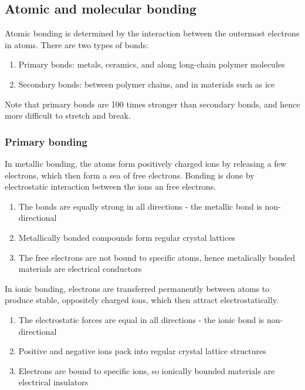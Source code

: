 \documentclass{article}
\begin{document}
\newpage

\subsection{Atomic and molecular bonding}

Atomic bonding is determined by the interaction between the outermost electrons in atoms. There are two types of bonds:

\begin{enumerate}
    \item Primary bonds: metals, ceramics, and along long-chain polymer molecules
    \item Secondary bonds: between polymer chains, and in materials such as ice
\end{enumerate}

Note that primary bonds are 100 times stronger than secondary bonds, and hence more difficult to stretch and break.

\subsubsection{Primary bonding}

\begin{definition}
    In metallic bonding, the atoms form positively charged ions by releasing a few electrons, which then form a sea of free electrons. Bonding is done by electrostatic interaction between the ions an free electrons.

    \begin{enumerate}
        \item The bonds are equally strong in all directions - the metallic bond is non-directional
        \item Metallically bonded compounds form regular crystal lattices
        \item The free electrons are not bound to specific atoms, hence metalically bonded materials are electrical conductors
    \end{enumerate}
\end{definition}

\begin{definition}
    In ionic bonding, electrons are transferred permanently between atoms to produce stable, oppositely charged ions, which then attract electrostatically.

    \begin{enumerate}
        \item The electrostatic forces are equal in all directions - the ionic bond is non-directional
        \item Positive and negative ions pack into regular crystal lattice structures
        \item Electrons are bound to specific ions, so ionically bounded materials are electrical insulators
    \end{enumerate}
\end{definition}
\end{document}
